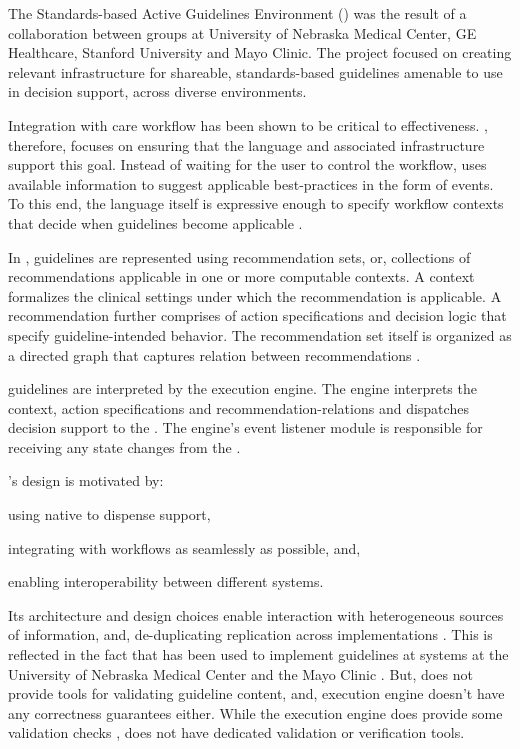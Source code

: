The Standards-based Active Guidelines Environment (\SAGE{}) was the
result of a collaboration between groups at University of Nebraska
Medical Center, GE Healthcare, Stanford University and Mayo Clinic.
The project focused on creating relevant infrastructure for shareable,
standards-based guidelines amenable to use in decision support, across
diverse \EHR{} environments.

Integration with care workflow has been shown to be critical to \CDSS{}
effectiveness. \SAGE{}, therefore, focuses on ensuring that the language
and associated infrastructure support this goal. Instead of waiting for
the user to control the workflow, \SAGE{} uses available information to
suggest applicable best-practices in the form of events. To this end,
the language itself is expressive enough to specify workflow contexts
that decide when guidelines become applicable \cite{TuAMIA07}.

In \SAGE{}, guidelines are represented using recommendation sets, or,
collections of recommendations applicable in one or more computable
contexts. A context formalizes the clinical settings under which
the recommendation is applicable. A recommendation further comprises
of action specifications and decision logic that specify guideline-intended
\HCP{} behavior. The recommendation set itself is organized as a directed
graph that captures relation between recommendations \cite{TuAMIA07}.

\SAGE{} guidelines are interpreted by the \SAGE{} execution engine.
The engine interprets the context, action specifications
and recommendation-relations and dispatches decision support
to the \EHR{}. The engine's event listener module is responsible
for receiving any state changes from the \EHR{} \cite{RamMEDINFO04}.

\SAGE{}'s design is motivated by:
\begin{enumerate*}[label=(\roman*)]
  \item using native \EHR{} to dispense support,
  \item integrating with workflows as seamlessly as possible, and,
  \item enabling interoperability between different \EHR{} systems.
\end{enumerate*}
Its architecture and design choices enable interaction with heterogeneous
sources of information, and, de-duplicating replication across \EHR{}
implementations \cite{TuAMIA07}. This is reflected in the fact that
\SAGE{} has been used to implement guidelines at \EHR{} systems
at the University of Nebraska Medical Center and the Mayo Clinic \cite{TuAMIA07}.
But, \SAGE{} does not provide tools for validating guideline content, and,
execution engine doesn't have any correctness guarantees either. While
the execution engine does provide some validation checks \cite{RamMEDINFO04},
\SAGE{} does not have dedicated validation or verification tools.

